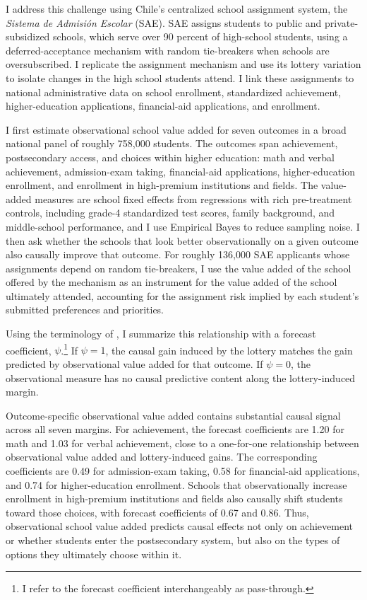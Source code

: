 \documentclass[a4paper, article, english, oneside, unknownkeysallowed, 12pt]{memoir}
\begin{document}
I address this challenge using Chile's centralized school assignment system, the \textit{Sistema de Admisi\'on Escolar} (SAE).
SAE assigns students to public and private-subsidized schools, which serve over 90 percent of high-school students, using a deferred-acceptance mechanism with random tie-breakers when schools are oversubscribed.
I replicate the assignment mechanism and use its lottery variation to isolate changes in the high school students attend.
I link these assignments to national administrative data on school enrollment, standardized achievement, higher-education applications, financial-aid applications, and enrollment.
 
I first estimate observational school value added for seven outcomes in a broad national panel of roughly 758,000 students.
The outcomes span achievement, postsecondary access, and choices within higher education: math and verbal achievement, admission-exam taking, financial-aid applications, higher-education enrollment, and enrollment in high-premium institutions and fields.
The value-added measures are school fixed effects from regressions with rich pre-treatment controls, including grade-4 standardized test scores, family background, and middle-school performance, and I use Empirical Bayes to reduce sampling noise.
I then ask whether the schools that look better observationally on a given outcome also causally improve that outcome.
For roughly 136,000 SAE applicants whose assignments depend on random tie-breakers, I use the value added of the school offered by the mechanism as an instrument for the value added of the school ultimately attended, accounting for the assignment risk implied by each student's submitted preferences and priorities.
 
Using the terminology of \textcite{angrist_leveraging_2017}, I summarize this relationship with a forecast coefficient, $\psi$.\footnote{I refer to the forecast coefficient interchangeably as pass-through.}
If $\psi = 1$, the causal gain induced by the lottery matches the gain predicted by observational value added for that outcome.
If $\psi = 0$, the observational measure has no causal predictive content along the lottery-induced margin.
 
Outcome-specific observational value added contains substantial causal signal across all seven margins.
For achievement, the forecast coefficients are 1.20 for math and 1.03 for verbal achievement, close to a one-for-one relationship between observational value added and lottery-induced gains.
The corresponding coefficients are 0.49 for admission-exam taking, 0.58 for financial-aid applications, and 0.74 for higher-education enrollment.
Schools that observationally increase enrollment in high-premium institutions and fields also causally shift students toward those choices, with forecast coefficients of 0.67 and 0.86.
Thus, observational school value added predicts causal effects not only on achievement or whether students enter the postsecondary system, but also on the types of options they ultimately choose within it.
 
\end{document}
